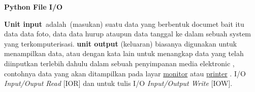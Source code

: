 

\sloppy
\begin{center}{\fontsize{24pt}{24pt}\selectfont \textbf{Python File I/O} \\}\end{center}
\textbf{Unit input}~adalah~(masukan) suatu  data yang berbentuk documet bait itu data data foto, data data hurup ataupun data tanggal ke dalam sebuah system yang  terkomputerisasi. 
\textbf{unit output} (keluaran) biasanya digunakan untuk menampilkan data, atau dengan kata lain untuk menangkap data yang telah diinputkan terlebih dahulu dalam sebuah penyimpanan media elektronic , contohnya data yang akan ditampilkan pada layar \href{https://id.wikipedia.org/wiki/Monitor}{monitor}
 atau \href{https://id.wikipedia.org/wiki/Printer}{printer}
.
I/O \textit{Input/Ouput Read} [IOR] dan untuk tulis I/O \textit{Input/Output Write} [IOW].

